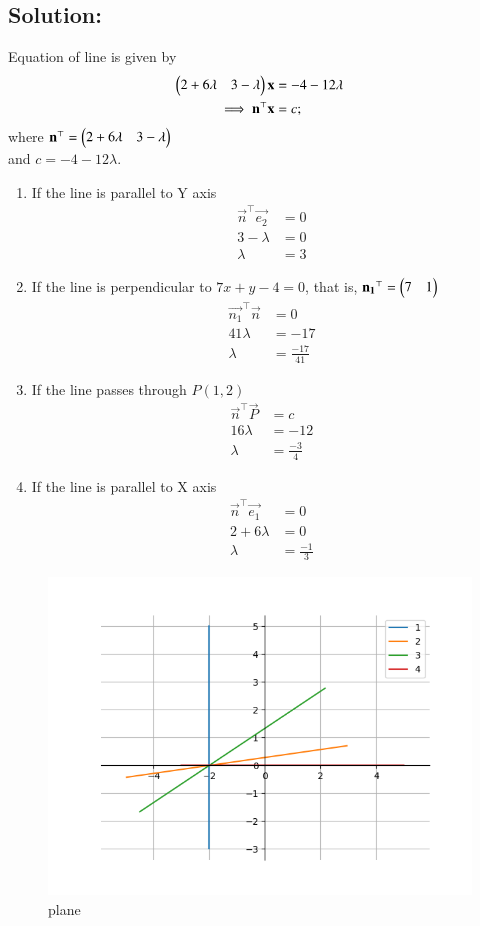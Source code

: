 \documentclass[journal]{IEEEtran}
\begin{document}
\subsection*{\textbf{Solution:}} 
Equation of line is given by
\begin{align}
    \begin{pmatrix}2+6\lambda &3-\lambda\end{pmatrix} \mathbf{x} &=-4-12\lambda\\
    \implies \mathbf{n}^\top \mathbf{x} &= c;
\end{align}
where $\mathbf{n}^\top = \begin{pmatrix}2+6\lambda &3-\lambda\end{pmatrix}$\\
and $c=-4-12\lambda$. \\
\begin{enumerate}

\item If the line is parallel to Y axis
\begin{align}
\vec{n}^\top \vec{e_2} &=0 \\
3 -\lambda &= 0 \\
\lambda &= 3
\end{align}




\item If the line is perpendicular to $7x+y-4=0$, that is, $\mathbf{n_1}^\top =\begin{pmatrix}7&1\end{pmatrix}$
\begin{align}
    \vec{n_1}^\top \vec{n} &= 0 \\
    41\lambda &= -17 \\
    \lambda &= \frac{-17}{41}
\end{align}

\item If the line passes through $P(1,2)$
\begin{align}
  \vec{n}^\top \vec{P} &= c \\
  16\lambda &= -12 \\
  \lambda &= \frac{-3}{4}
\end{align}

\item If the line is parallel to X axis
\begin{align}
\vec{n}^\top \vec{e_1} &=0 \\
2+6\lambda &= 0 \\
\lambda &= \frac{-1}{3}
\end{align}
\end{enumerate}

\begin{figure}[H]
\centering
\includegraphics[width=0.7\columnwidth]{figs/fig.png} 
\caption{plane}
\label{}
\end{figure}
\end{document}
